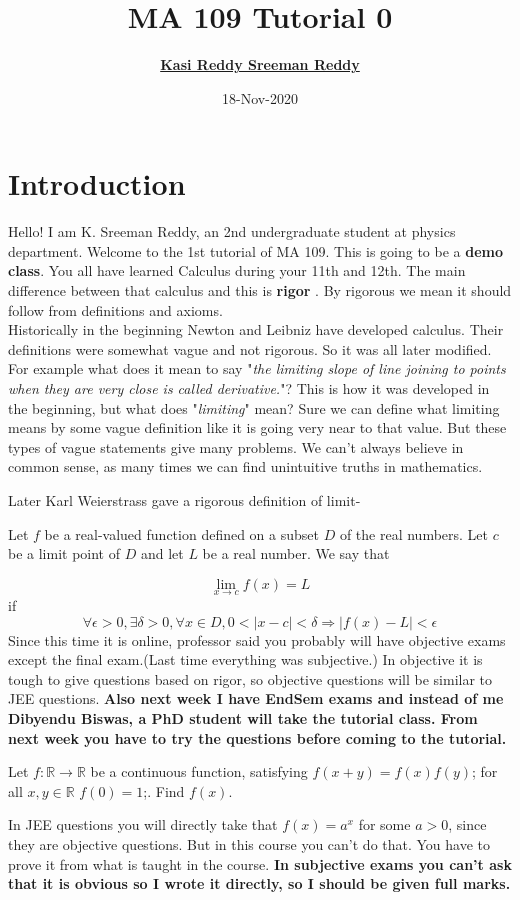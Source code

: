 \documentclass[11pt]{beamer}
\author[K. Sreeman Reddy]{\href{http://iamsreeman.github.io/}{\textbf{Kasi Reddy Sreeman Reddy}}\linebreak\text{2nd year physics student}\linebreak\text{\href{http://iamsreeman.github.io/MA109}{http://iamsreeman.github.io/MA109}}}
\title{MA 109 Tutorial 0}
\institute[]{IIT Bombay}
\date{18-Nov-2020}
\begin{document}
\begin{frame}
\titlepage
\end{frame}


\section{Introduction}
Hello! I am K. Sreeman Reddy, an 2nd undergraduate student at physics department. Welcome to the 1st tutorial of MA 109. This is going to be a \textbf{demo class}. You all have learned Calculus during your 11th and 12th. The main difference between that calculus and this is \textbf{rigor }. By rigorous we mean it should follow from definitions and axioms.\\
Historically in the beginning Newton and Leibniz have developed calculus. Their definitions were somewhat vague and not rigorous. So it was all later modified. For example what does it mean to say "\textit{the limiting slope of line joining to points when they are very close is called derivative.}"? This is how it was developed in the beginning, but what does "\textit{limiting}" mean? Sure we can define what limiting means by some vague definition like it is going very near to that value. But these types of vague statements give many problems. We can't always believe in common sense, as many times we can find unintuitive truths in mathematics. 
\begin{frame}
Later Karl Weierstrass gave a rigorous definition of limit-
\begin{definition}
Let ${\displaystyle f}$ be a real-valued function defined on a subset $ {\displaystyle D}$ of the real numbers. Let ${\displaystyle c}$ be a limit point of ${\displaystyle D}$ and let ${\displaystyle L}$ be a real number. We say that

    $${\displaystyle \lim _{x\to c}f(x)=L}$$
if
$$\forall \epsilon>0,\exists\delta>0,\forall x\in D,0<|x-c|<\delta\Rightarrow |f(x)-L|<\epsilon$$
Since this time it is online, professor said you probably will have objective exams except the final exam.(Last time everything was subjective.) In objective it is tough to give questions based on rigor, so objective questions will be similar to JEE questions. \textbf{Also next week I have EndSem exams and instead of me Dibyendu Biswas, a PhD student will take the tutorial class. From next week you have to try the questions before coming to the tutorial.}
\end{definition}
\end{frame} 
\begin{frame}
\begin{example}
Let $f : \mathbb{R} \rightarrow \mathbb{R}$ be a continuous function, satisfying
$f(x + y) = f(x)f(y)$; for all $x,y \in \mathbb{R}$ $f(0) = 1$;. Find $f(x)$.
\end{example}
In JEE questions you will directly take that $f(x)=a^x$ for some $a>0$, since they are objective questions. But in this course you can't do that. You have to prove it from what is taught in the course. \textbf{In subjective exams you can't ask that it is obvious so I wrote it directly, so I should be given full marks.}
\end{frame}
\end{document}
